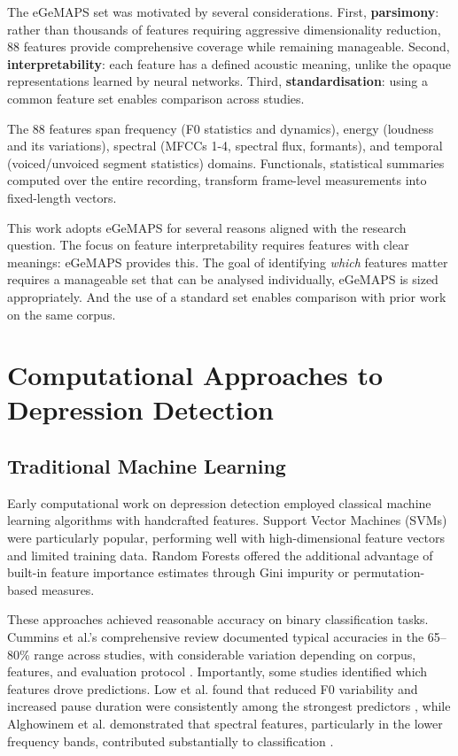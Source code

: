 The eGeMAPS set was motivated by several considerations. First, \textbf{parsimony}: rather than thousands of features requiring aggressive dimensionality reduction, 88 features provide comprehensive coverage while remaining manageable. Second, \textbf{interpretability}: each feature has a defined acoustic meaning, unlike the opaque representations learned by neural networks. Third, \textbf{standardisation}: using a common feature set enables comparison across studies.

The 88 features span frequency (F0 statistics and dynamics), energy (loudness and its variations), spectral (MFCCs 1-4, spectral flux, formants), and temporal (voiced/unvoiced segment statistics) domains. Functionals, statistical summaries computed over the entire recording, transform frame-level measurements into fixed-length vectors.

This work adopts eGeMAPS for several reasons aligned with the research question. The focus on feature interpretability requires features with clear meanings: eGeMAPS provides this. The goal of identifying \textit{which} features matter requires a manageable set that can be analysed individually, eGeMAPS is sized appropriately. And the use of a standard set enables comparison with prior work on the same corpus.

\section{Computational Approaches to Depression Detection}

\subsection{Traditional Machine Learning}

Early computational work on depression detection employed classical machine learning algorithms with handcrafted features. Support Vector Machines (SVMs) were particularly popular, performing well with high-dimensional feature vectors and limited training data. Random Forests offered the additional advantage of built-in feature importance estimates through Gini impurity or permutation-based measures.

These approaches achieved reasonable accuracy on binary classification tasks. Cummins et al.'s comprehensive review documented typical accuracies in the 65--80\% range across studies, with considerable variation depending on corpus, features, and evaluation protocol \cite{Cummins2015}. Importantly, some studies identified which features drove predictions. Low et al. found that reduced F0 variability and increased pause duration were consistently among the strongest predictors \cite{low2011automated}, while Alghowinem et al. demonstrated that spectral features, particularly in the lower frequency bands, contributed substantially to classification \cite{alghowinem2013comparative}.

